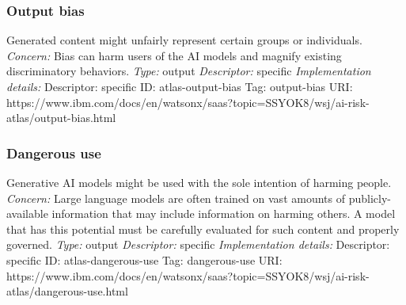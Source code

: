 \documentclass{article}
\begin{document}
\subsubsection*{Output bias}
Generated content might unfairly represent certain groups or individuals.\newline
\textit{Concern: }Bias can harm users of the AI models and magnify existing discriminatory behaviors.\newline\newline
\textit{Type: }output\newline
\textit{Descriptor: }specific \newline\newline
\textit{Implementation details:} \newline
Descriptor: specific \newline
ID: atlas-output-bias \newline
Tag: output-bias \newline
URI:  https://www.ibm.com/docs/en/watsonx/saas?topic=SSYOK8/wsj/ai-risk-atlas/output-bias.html\newline
\subsubsection*{Dangerous use}
Generative AI models might be used with the sole intention of harming people.\newline
\textit{Concern: }Large language models are often trained on vast amounts of publicly-available information that may include information on harming others. A model that has this potential must be carefully evaluated for such content and properly governed.\newline\newline
\textit{Type: }output\newline
\textit{Descriptor: }specific \newline\newline
\textit{Implementation details:} \newline
Descriptor: specific \newline
ID: atlas-dangerous-use \newline
Tag: dangerous-use \newline
URI:  https://www.ibm.com/docs/en/watsonx/saas?topic=SSYOK8/wsj/ai-risk-atlas/dangerous-use.html\newline
\end{document}
